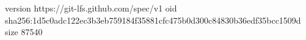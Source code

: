 version https://git-lfs.github.com/spec/v1
oid sha256:1d5c0adc122ec3b3eb759184f35881cfc475b0d300c84830b36edf35bcc1509d
size 87540
